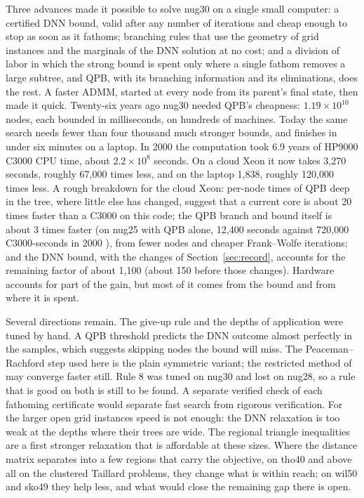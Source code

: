 \documentclass[10pt]{article}
\theoremstyle{remark}
\begin{document}
Three advances made it possible to solve nug30 on a single small computer: a
certified DNN bound, valid after any number of iterations and cheap enough to stop
as soon as it fathoms; branching rules that use the geometry of grid instances and
the marginals of the DNN solution at no cost; and a division of labor in which the
strong bound is spent only where a single fathom removes a large subtree, and QPB,
with its branching information and its eliminations, does the rest. A faster ADMM,
started at every node from its parent's final state, then made it quick. Twenty-six years ago nug30 needed QPB's cheapness:
$1.19\times10^{10}$ nodes, each bounded in milliseconds, on hundreds of machines.
Today the same search needs fewer than four thousand much stronger bounds, and
finishes in under six minutes on a laptop. In 2000 the computation took 6.9 years of
HP9000 C3000 CPU time, about $2.2\times10^8$ seconds. On a cloud Xeon it now takes
3,270 seconds, roughly 67,000 times less, and on the laptop 1,838,
roughly 120,000 times less. A rough breakdown for the cloud Xeon: per-node times of
QPB deep in the tree, where little else has changed, suggest that a current core is
about 20 times faster than a C3000 on this code; the QPB branch and bound itself is
about 3 times faster (on nug25 with QPB alone, 12,400 seconds against 720,000
C3000-seconds in 2000 \cite{thesis}), from fewer nodes and cheaper Frank--Wolfe
iterations; and the DNN bound, with the changes of Section~\ref{sec:record}, accounts
for the remaining factor of about 1,100 (about 150 before those changes).
Hardware accounts for part of the gain, but most of it comes from the bound and from
where it is spent.

Several directions remain. The give-up rule and the depths of application were
tuned by hand. A QPB threshold predicts the DNN outcome almost perfectly in the
samples, which suggests skipping nodes the bound will miss. The
Peaceman--Rachford step used here is the plain symmetric variant; the restricted
method of \cite{graham} may converge faster still. Rule 8 was tuned on nug30 and lost
on nug28, so a rule that is good on both is still to be found. A
separate verified check of each fathoming certificate would separate fast search
from rigorous verification. For the larger open grid instances speed is not
enough: the DNN relaxation is too weak at the depths where their trees are wide.
The regional triangle inequalities are a first stronger relaxation that is
affordable at these sizes. Where the distance matrix separates into a few regions
that carry the objective, on tho40 and above all on the clustered Taillard
problems, they change what is within reach; on wil50 and sko49 they help less, and
what would close the remaining gap there is open.
\end{document}
